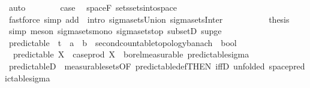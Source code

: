 \begin{isabellebody}
\ auto\isanewline
\ \ \ \ \ \ \isamarkupfalse%
\ {\isacharquery}{\kern0pt}case\ \isamarkupfalse%
\ space{\isacharunderscore}{\kern0pt}F\ sets{\isachardot}{\kern0pt}sets{\isacharunderscore}{\kern0pt}into{\isacharunderscore}{\kern0pt}space\ {}\ \isamarkupfalse%
\ {\isacharparenleft}{\kern0pt}fastforce\ simp\ add{\isacharcolon}{\kern0pt}\ {\isacharasterisk}{\kern0pt}\ intro{\isacharbang}{\kern0pt}{\isacharcolon}{\kern0pt}\ sigma{\isacharunderscore}{\kern0pt}sets{\isachardot}{\kern0pt}Union\ sigma{\isacharunderscore}{\kern0pt}sets{\isacharunderscore}{\kern0pt}Inter{\isacharparenright}{\kern0pt}\isanewline
\ \ \ \ \isamarkupfalse%
\isanewline
\ \ \ \ \isamarkupfalse%
\ {\isacharquery}{\kern0pt}thesis\ \isamarkupfalse%
\ {\isacharasterisk}{\kern0pt}\ \isamarkupfalse%
\ {\isacharparenleft}{\kern0pt}simp{\isacharcomma}{\kern0pt}\ meson\ sigma{\isacharunderscore}{\kern0pt}sets{\isacharunderscore}{\kern0pt}mono{\isacharprime}{\kern0pt}{\isacharprime}{\kern0pt}\ sigma{\isacharunderscore}{\kern0pt}sets{\isacharunderscore}{\kern0pt}top\ subsetD\ sup{\isacharunderscore}{\kern0pt}ge{}{\isacharparenright}{\kern0pt}\isanewline
\ \ \isamarkupfalse%
\isanewline
{}\isamarkupfalse%
%
\endisatagproof
{\isafoldproof}%
%
\isadelimproof
\isanewline
%
\endisadelimproof
\isanewline
{}\isamarkupfalse%
\ predictable\ {\isacharcolon}{\kern0pt}{\isacharcolon}{\kern0pt}\ {\isachardoublequoteopen}{\isacharparenleft}{\kern0pt}{\isacharprime}{\kern0pt}t\ {\isasymRightarrow}\ {\isacharprime}{\kern0pt}a\ {\isasymRightarrow}\ {\isacharprime}{\kern0pt}b\ {\isacharcolon}{\kern0pt}{\isacharcolon}{\kern0pt}\ {\isacharbraceleft}{\kern0pt}second{\isacharunderscore}{\kern0pt}countable{\isacharunderscore}{\kern0pt}topology{\isacharcomma}{\kern0pt}banach{\isacharbraceright}{\kern0pt}{\isacharparenright}{\kern0pt}\ {\isasymRightarrow}\ bool{\isachardoublequoteclose}\ \isanewline
\ \ {\isachardoublequoteopen}predictable\ X\ {\isacharequal}{\kern0pt}\ {\isacharparenleft}{\kern0pt}case{\isacharunderscore}{\kern0pt}prod\ X\ {\isasymin}\ borel{\isacharunderscore}{\kern0pt}measurable\ {\isacharparenleft}{\kern0pt}predictable{\isacharunderscore}{\kern0pt}sigma{\isacharparenright}{\kern0pt}{\isacharparenright}{\kern0pt}{\isachardoublequoteclose}\isanewline
\isanewline
{}\isamarkupfalse%
\ predictableD\ {\isacharequal}{\kern0pt}\ measurable{\isacharunderscore}{\kern0pt}sets{\isacharbrackleft}{\kern0pt}OF\ predictable{\isacharunderscore}{\kern0pt}def{\isacharbrackleft}{\kern0pt}THEN\ iffD{}{\isacharbrackright}{\kern0pt}{\isacharcomma}{\kern0pt}\ unfolded\ space{\isacharunderscore}{\kern0pt}predictable{\isacharunderscore}{\kern0pt}sigma{\isacharbrackright}{\kern0pt}\isanewline

\end{isabellebody}
